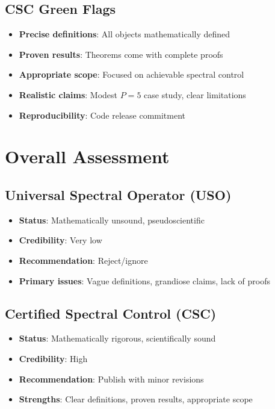 \documentclass[10pt]{article}
\begin{document}
\subsection*{CSC Green Flags}
\begin{itemize}
\item \textcolor{greenflag}{\textbf{Precise definitions}}: All objects mathematically defined
\item \textcolor{greenflag}{\textbf{Proven results}}: Theorems come with complete proofs
\item \textcolor{greenflag}{\textbf{Appropriate scope}}: Focused on achievable spectral control
\item \textcolor{greenflag}{\textbf{Realistic claims}}: Modest $P=5$ case study, clear limitations
\item \textcolor{greenflag}{\textbf{Reproducibility}}: Code release commitment
\end{itemize}

\section*{Overall Assessment}

\subsection*{Universal Spectral Operator (USO)}
\begin{itemize}
\item \textbf{Status}: \textcolor{redflag}{Mathematically unsound, pseudoscientific}
\item \textbf{Credibility}: \textcolor{redflag}{Very low}
\item \textbf{Recommendation}: \textcolor{redflag}{Reject/ignore}
\item \textbf{Primary issues}: Vague definitions, grandiose claims, lack of proofs
\end{itemize}

\subsection*{Certified Spectral Control (CSC)}
\begin{itemize}
\item \textbf{Status}: \textcolor{greenflag}{Mathematically rigorous, scientifically sound}
\item \textbf{Credibility}: \textcolor{greenflag}{High}
\item \textbf{Recommendation}: \textcolor{greenflag}{Publish with minor revisions}
\item \textbf{Strengths}: Clear definitions, proven results, appropriate scope
\end{itemize}
\end{document}
